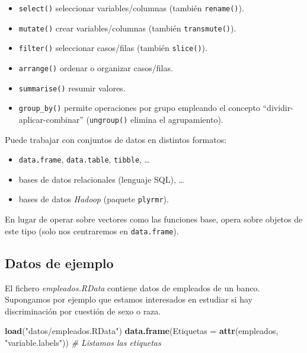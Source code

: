 \documentclass[]{book}
\newenvironment{Shaded}{\begin{snugshade}}{\end{snugshade}}
\newcommand{\CommentTok}[1]{\textcolor[rgb]{0.56,0.35,0.01}{\textit{#1}}}
\newcommand{\DataTypeTok}[1]{\textcolor[rgb]{0.13,0.29,0.53}{#1}}
\newcommand{\KeywordTok}[1]{\textcolor[rgb]{0.13,0.29,0.53}{\textbf{#1}}}
\newcommand{\NormalTok}[1]{#1}
\newcommand{\StringTok}[1]{\textcolor[rgb]{0.31,0.60,0.02}{#1}}
\providecommand{\tightlist}{%
  \setlength{\itemsep}{0pt}\setlength{\parskip}{0pt}}
\begin{document}
\begin{itemize}
\tightlist
\item
  \texttt{select()} seleccionar variables/columnas (también \texttt{rename()}).
\item
  \texttt{mutate()} crear variables/columnas (también \texttt{transmute()}).
\item
  \texttt{filter()} seleccionar casos/filas (también \texttt{slice()}).
\item
  \texttt{arrange()} ordenar o organizar casos/filas.
\item
  \texttt{summarise()} resumir valores.
\item
  \texttt{group\_by()} permite operaciones por grupo empleando el concepto
  ``dividir-aplicar-combinar'' (\texttt{ungroup()} elimina el agrupamiento).
\end{itemize}

Puede trabajar con conjuntos de datos en distintos formatos:

\begin{itemize}
\tightlist
\item
  \texttt{data.frame}, \texttt{data.table}, \texttt{tibble}, \ldots{}
\item
  bases de datos relacionales (lenguaje SQL), \ldots{}
\item
  bases de datos \emph{Hadoop} (paquete \texttt{plyrmr}).
\end{itemize}

En lugar de operar sobre vectores como las funciones base,
opera sobre objetos de este tipo (solo nos centraremos en \texttt{data.frame}).

\hypertarget{datos-de-ejemplo-1}{%
\subsection{Datos de ejemplo}\label{datos-de-ejemplo-1}}

El fichero \emph{empleados.RData} contiene datos de empleados de un banco.
Supongamos por ejemplo que estamos interesados en estudiar si hay
discriminación por cuestión de sexo o raza.

\begin{Shaded}
\begin{Highlighting}[]
\KeywordTok{load}\NormalTok{(}\StringTok{"datos/empleados.RData"}\NormalTok{)}
\KeywordTok{data.frame}\NormalTok{(}\DataTypeTok{Etiquetas =} \KeywordTok{attr}\NormalTok{(empleados, }\StringTok{"variable.labels"}\NormalTok{))  }\CommentTok{# Listamos las etiquetas}
\end{Highlighting}
\end{Shaded}
\end{document}
